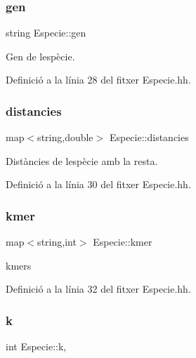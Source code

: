 \subsubsection{\texorpdfstring{gen}{gen}}
{\footnotesize\ttfamily string Especie\+::gen\hspace{0.3cm}{\ttfamily [private]}}



Gen de l\textquotesingle{}espècie. 



Definició a la línia 28 del fitxer Especie.\+hh.

\mbox{\label{class_especie_ad4bbf9359ebc17c3c7f501bc31c86509}} 
\subsubsection{\texorpdfstring{distancies}{distancies}}
{\footnotesize\ttfamily map$<$string,double$>$ Especie\+::distancies\hspace{0.3cm}{\ttfamily [private]}}



Distàncies de l\textquotesingle{}espècie amb la resta. 



Definició a la línia 30 del fitxer Especie.\+hh.

\mbox{\label{class_especie_ab6740db160f2d7335a98fa8d9f745cbe}} 
\subsubsection{\texorpdfstring{kmer}{kmer}}
{\footnotesize\ttfamily map$<$string,int$>$ Especie\+::kmer\hspace{0.3cm}{\ttfamily [private]}}



kmers 



Definició a la línia 32 del fitxer Especie.\+hh.

\mbox{\label{class_especie_a592c0ddeeebc786969f3040fbefea9df}} 
\subsubsection{\texorpdfstring{k}{k}}
{\footnotesize\ttfamily int Especie\+::k\hspace{0.3cm}{\ttfamily [static]}, {\ttfamily [private]}}



